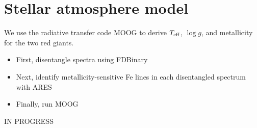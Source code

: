 \section{Stellar atmosphere model}\label{atm}
We use the radiative transfer code MOOG \citep{sne73} to derive $T_{\rm{eff}}$, $\log g$, and metallicity for the two red giants.
\begin{itemize}
\item First, disentangle spectra using FDBinary
\item Next, identify metallicity-sensitive Fe lines in each disentangled spectrum with ARES
\item Finally, run MOOG
\end{itemize}

IN PROGRESS